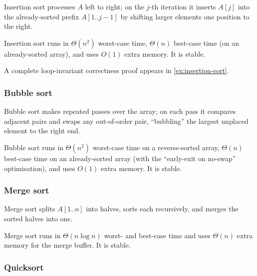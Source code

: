 Insertion sort processes $A$ left to right; on the $j$-th iteration it
inserts $A[j]$ into the already-sorted prefix $A[1..j-1]$ by shifting
larger elements one position to the right.

\begin{proposition}
\label{prop:insertion-sort}
Insertion sort runs in $\Theta(n^2)$ worst-case time, $\Theta(n)$
best-case time (on an already-sorted array), and uses $O(1)$ extra
memory. It is stable.
\end{proposition}

A complete loop-invariant correctness proof appears in
\cref{ex:insertion-sort}.

\subsubsection*{Bubble sort}

Bubble sort makes repeated passes over the array; on each pass it
compares adjacent pairs and swaps any out-of-order pair, ``bubbling''
the largest unplaced element to the right end.

\begin{proposition}
\label{prop:bubble-sort}
Bubble sort runs in $\Theta(n^2)$ worst-case time on a reverse-sorted
array, $\Theta(n)$ best-case time on an already-sorted array (with the
``early-exit on no-swap'' optimisation), and uses $O(1)$ extra memory.
It is stable.
\end{proposition}

\subsubsection*{Merge sort}

Merge sort splits $A[1..n]$ into halves, sorts each recursively, and
merges the sorted halves into one.

\begin{proposition}
\label{prop:merge-sort}
Merge sort runs in $\Theta(n \log n)$ worst- and best-case time and
uses $\Theta(n)$ extra memory for the merge buffer. It is stable.
\end{proposition}

\subsubsection*{Quicksort}

